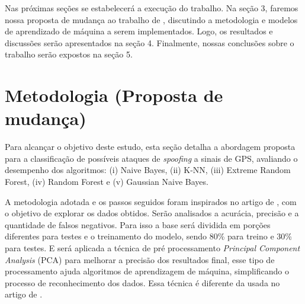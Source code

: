 \documentclass[12pt]{article}
\begin{document}
Nas próximas seções se estabelecerá a execução do trabalho. Na seção 3, faremos 
nossa proposta de mudança ao trabalho de \cite{Aissou2021}, discutindo a 
metodologia e modelos de aprendizado de máquina a
serem implementados. Logo, os resultados e 
discussões serão apresentados na seção 4. Finalmente, nossas conclusões sobre o 
trabalho serão expostos na seção 5.

\section{Metodologia (Proposta de mudança)}

Para alcançar o objetivo deste estudo, esta seção detalha a abordagem proposta para a classificação de possíveis ataques de \textit{spoofing} 
a sinais de GPS, avaliando o desempenho dos algoritmos: (i) Naive Bayes, (ii) K-NN, (iii) Extreme Random Forest, (iv) Random Forest e (v)  Gaussian Naive Bayes. 

A metodologia adotada e os passos seguidos foram inspirados no artigo de \cite{Aissou2021}, com o objetivo de explorar os dados obtidos. Serão analisados a acurácia, 
precisão e a quantidade de falsos negativos. 
Para isso a base será dividida em porções diferentes para testes e o treinamento do modelo, sendo 80\% para treino e 30\% para testes. E será aplicada a técnica de pré processamento 
\textit{Principal Component Analysis} (PCA) para melhorar a precisão dos resultados final, esse tipo de processamento ajuda algoritmos de aprendizagem de máquina, simplificando o processo de reconhecimento dos dados.  Essa técnica é
diferente da usada no artigo de \cite{Aissou2021}.








\end{document}
